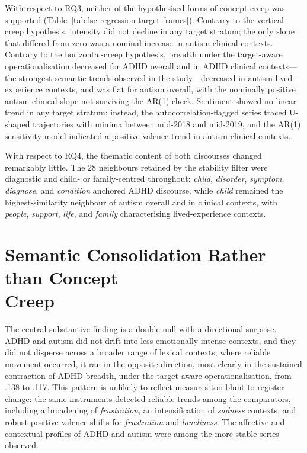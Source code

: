 With respect to RQ3, neither of the hypothesised forms of concept creep was supported (Table~\ref{tab:lsc-regression-target-frames}). Contrary to the vertical-creep hypothesis, intensity did not decline in any target stratum; the only slope that differed from zero was a nominal increase in autism clinical contexts. Contrary to the horizontal-creep hypothesis, breadth under the target-aware operationalisation decreased for ADHD overall and in ADHD clinical contexts---the strongest semantic trends observed in the study---decreased in autism lived-experience contexts, and was flat for autism overall, with the nominally positive autism clinical slope not surviving the AR(1) check. Sentiment showed no linear trend in any target stratum; instead, the autocorrelation-flagged series traced U-shaped trajectories with minima between mid-2018 and mid-2019, and the AR(1) sensitivity model indicated a positive valence trend in autism clinical contexts.

With respect to RQ4, the thematic content of both discourses changed remarkably little. The 28 neighbours retained by the stability filter were diagnostic and child- or family-centred throughout: \emph{child}, \emph{disorder}, \emph{symptom}, \emph{diagnose}, and \emph{condition} anchored ADHD discourse, while \emph{child} remained the highest-similarity neighbour of autism overall and in clinical contexts, with \emph{people}, \emph{support}, \emph{life}, and \emph{family} characterising lived-experience contexts.

\section[Semantic Consolidation Rather than Concept Creep]{Semantic Consolidation Rather than Concept\texorpdfstring{\\}{ }Creep}
\label{sec:discussion-semantic-consolidation}

The central substantive finding is a double null with a directional surprise. ADHD and autism did not drift into less emotionally intense contexts, and they did not disperse across a broader range of lexical contexts; where reliable movement occurred, it ran in the opposite direction, most clearly in the sustained contraction of ADHD breadth, under the target-aware operationalisation, from .138 to .117. This pattern is unlikely to reflect measures too blunt to register change: the same instruments detected reliable trends among the comparators, including a broadening of \textit{frustration}, an intensification of \textit{sadness} contexts, and robust positive valence shifts for \textit{frustration} and \textit{loneliness}. The affective and contextual profiles of ADHD and autism were among the more stable series observed.


